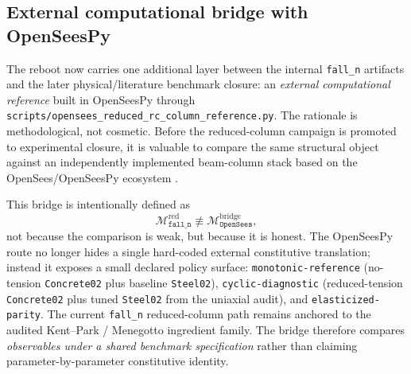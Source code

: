\subsection{External computational bridge with OpenSeesPy}
\label{sec:validation-reboot-opensees-bridge}

The reboot now carries one additional layer between the internal
\texttt{fall\_n} artifacts and the later physical/literature benchmark
closure: an \emph{external computational reference} built in OpenSeesPy through
\texttt{scripts/opensees\_reduced\_rc\_column\_reference.py}.  The rationale is
methodological, not cosmetic.  Before the reduced-column campaign is promoted
to experimental closure, it is valuable to compare the same structural object
against an independently implemented beam-column stack based on the
OpenSees/OpenSeesPy ecosystem
\cite{OpenSeesWebsite,OpenSeesPyDocs,Scott2008_SoftwarePatternsBeamColumnModels,Li2013_FiberSectionTimoshenkoElementOpenSees}.

This bridge is intentionally defined as
\begin{equation}
  \mathcal{M}_{\texttt{fall\_n}}^{\mathrm{red}}
  \not\equiv
  \mathcal{M}_{\texttt{OpenSees}}^{\mathrm{bridge}},
\end{equation}
not because the comparison is weak, but because it is honest.  The OpenSeesPy
route no longer hides a single hard-coded external constitutive translation;
instead it exposes a small declared policy surface:
\texttt{monotonic-reference} (no-tension \texttt{Concrete02} plus baseline
\texttt{Steel02}), \texttt{cyclic-diagnostic} (reduced-tension
\texttt{Concrete02} plus tuned \texttt{Steel02} from the uniaxial audit), and
\texttt{elasticized-parity}.  The current \texttt{fall\_n} reduced-column path
remains anchored to the audited Kent--Park / Menegotto ingredient family.  The
bridge therefore compares \emph{observables under a shared benchmark
specification} rather than claiming parameter-by-parameter constitutive
identity.

